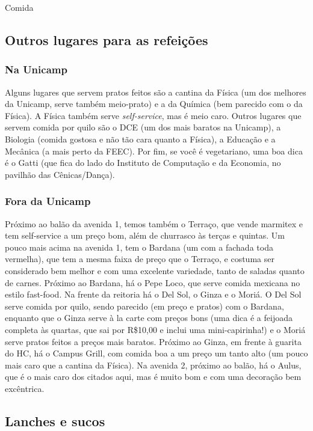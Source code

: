 \begin{story}{Comida}
\subsection*{Outros lugares para as refeições}

\subsubsection*{Na Unicamp}

Alguns lugares que servem pratos feitos são a cantina da Física (um dos melhores da Unicamp, serve também meio-prato) e a da Química (bem parecido com o da Física). A Física também serve \emph{self-service}, mas é meio caro. Outros lugares que servem comida por quilo são o DCE (um dos mais baratos na Unicamp), a Biologia (comida gostosa e não tão cara quanto a Física), a Educação e a Mecânica (a mais perto da FEEC). Por fim, se você é vegetariano, uma boa dica é o Gatti (que fica do lado do Instituto de Computação e da Economia, no pavilhão das Cênicas/Dança).

\subsubsection*{Fora da Unicamp}

Próximo ao balão da avenida 1, temos também o Terraço, que vende marmitex e tem self-service a um preço bom, além de churrasco às terças e quintas. Um pouco mais acima na avenida 1, tem o Bardana (um com a fachada toda vermelha), que tem a mesma faixa de preço que o Terraço, e costuma ser considerado bem melhor e com uma excelente variedade, tanto de saladas quanto de carnes. Próximo ao Bardana, há o Pepe Loco, que serve comida mexicana no estilo fast-food. Na frente da reitoria há o Del Sol, o Ginza e o Moriá. O Del Sol serve comida por quilo, sendo parecido (em preço e pratos) com o Bardana, enquanto que o Ginza serve à la carte com preços bons (uma dica é a feijoada completa às quartas, que sai por R\$10,00 e inclui uma mini-capirinha!) e o Moriá serve pratos feitos a preços mais baratos. Próximo ao Ginza, em frente à guarita do HC, há o Campus Grill, com comida boa a um preço um tanto alto (um pouco mais caro que a cantina da Física). Na avenida 2, próximo ao balão, há o Aulus, que é o mais caro dos citados aqui, mas é muito bom e com uma decoração bem excêntrica.

\subsection*{Lanches e sucos}


\end{story}
